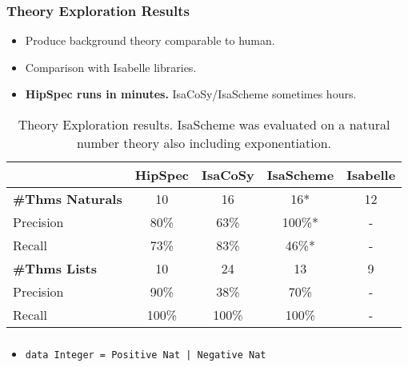 \documentclass[serif,professionalfont]{beamer}
\newcommand\hs[1]{\texttt{#1}}
\begin{document}
\begin{frame}


\frametitle{Theory Exploration Results}
\begin{itemize}
\item Produce background theory comparable to human.
\item Comparison with Isabelle libraries.
\item \textbf{HipSpec runs in minutes.} IsaCoSy/IsaScheme sometimes hours.
\end{itemize}
 \begin{table}[htd]
\begin{center}
\begin{tabular}{l|c|c|c||c}
                           & HipSpec & IsaCoSy & IsaScheme & Isabelle\\
 \hline
 \textbf{\#Thms Naturals}  & 10      & 16      & 16*       & 12\\
 \hline
  Precision                & 80\%    & 63\%    & 100\%*    & -\\
  Recall                   & 73\%    & 83\%    & 46\%*     & -\\
\hline
 \textbf{\#Thms Lists}     & 10      & 24      & 13        & 9 \\
  \hline
  Precision                & 90\%    & 38\%    & 70\%      & -\\
  Recall                   & 100\%   & 100\%   & 100\%     & -\\
\end{tabular}
\end{center}
\caption{Theory Exploration results. IsaScheme was evaluated on a natural number theory also including exponentiation.}
\label{tab:expl}
\end{table}%

\end{frame}

\begin{frame}
  \frametitle{}

  \begin{itemize}
    \item \hs{data Integer = Positive Nat | Negative Nat}
  \end{itemize}


\end{frame}
\end{document}
